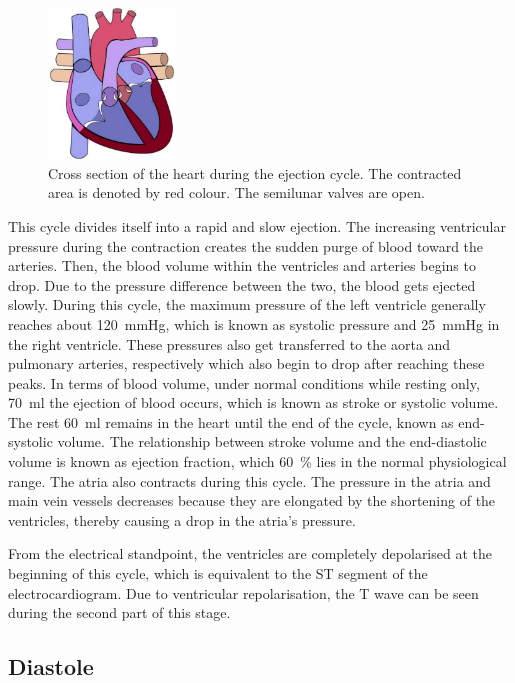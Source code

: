 \begin{figure}[!htpb]
	\centering
	\includegraphics[height=4cm,keepaspectratio]{figure_6}
	\caption[Cross section of the heart during the ejection cycle]{Cross section of the heart during the ejection cycle. The contracted area is denoted by red colour. The semilunar valves are open.}
	\label{fig:heart ejection}
\end{figure}

This cycle divides itself into a rapid and slow ejection. The increasing ventricular pressure during the contraction creates the sudden purge of blood toward the arteries. Then, the blood volume within the ventricles and arteries begins to drop. Due to the pressure difference between the two, the blood gets ejected slowly. During this cycle, the maximum pressure of the left ventricle generally reaches about \SI{120}{\mmHg}, which is known as systolic pressure and \SI{25}{\mmHg} in the right ventricle. These pressures also get transferred to the aorta and pulmonary arteries, respectively which also begin to drop after reaching these peaks. In terms of blood volume, under normal conditions while resting only, \SI{70}{\milli\litre} the ejection of blood occurs, which is known as stroke or systolic volume. The rest \SI{60}{\milli\litre} remains in the heart until the end of the cycle, known as end-systolic volume. The relationship between stroke volume and the end-diastolic volume is known as ejection fraction, which \SI{60}{\percent} lies in the normal physiological range. The atria also contracts during this cycle. The pressure in the atria and main vein vessels decreases because they are elongated by the shortening of the ventricles, thereby causing a drop in the atria's pressure. 

From the electrical standpoint, the ventricles are completely depolarised at the beginning of this cycle, which is equivalent to the ST segment of the electrocardiogram. Due to ventricular repolarisation, the T wave can be seen during the second part of this stage. 

\subsection{Diastole}
